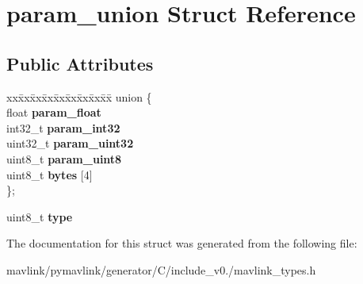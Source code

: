\hypertarget{structparam__union}{}\section{param\+\_\+union Struct Reference}
\label{structparam__union}
\subsection*{Public Attributes}
\begin{DoxyCompactItemize}
\item 
\mbox{\label{structparam__union_a3e627016bbfed55958338fd5b232a98c}} 
\begin{tabbing}
xx\=xx\=xx\=xx\=xx\=xx\=xx\=xx\=xx\=\kill
union \{\\
\>float {\bfseries param\_float}\\
\>int32\_t {\bfseries param\_int32}\\
\>uint32\_t {\bfseries param\_uint32}\\
\>uint8\_t {\bfseries param\_uint8}\\
\>uint8\_t {\bfseries bytes} \mbox{[}4\mbox{]}\\
\}; \\

\end{tabbing}\item 
\mbox{\label{structparam__union_a931bfe7edb069e632613635165968af6}} 
uint8\+\_\+t {\bfseries type}
\end{DoxyCompactItemize}


The documentation for this struct was generated from the following file\+:\begin{DoxyCompactItemize}
\item 
mavlink/pymavlink/generator/\+C/include\+\_\+v0./mavlink\+\_\+types.\+h\end{DoxyCompactItemize}
